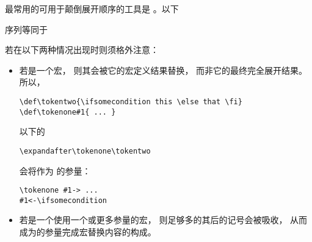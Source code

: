 \documentclass{book}
\begin{document}
最常用的可用于颠倒展开顺序的工具是
。以下
\begin{disp}\end{disp}
序列等同于
\begin{disp}
\end{disp}
若在以下两种情况出现时则须格外注意：
\begin{itemize} \item 若是一个宏，
则其会被它的宏定义结果替换，
而非它的最终完全展开结果。所以，
\begin{verbatim}
\def\tokentwo{\ifsomecondition this \else that \fi}
\def\tokenone#1{ ... }
\end{verbatim}
以下的
\begin{verbatim}
\expandafter\tokenone\tokentwo
\end{verbatim}
会将作为
的参量：
\begin{verbatim}
\tokenone #1-> ...
#1<-\ifsomecondition
\end{verbatim}
\item 若是一个使用一个或更多参量的宏，
则足够多的其后的记号会被吸收，
从而成为的参量完成宏替换内容的构成。
\end{itemize}
\end{document}
